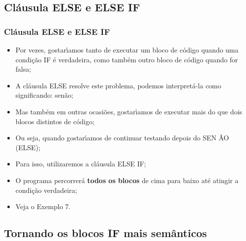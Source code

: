 \documentclass[xcolor=table]{beamer}
\newenvironment{stepitemize}{\begin{itemize}[<+->]}{\end{itemize} }
\begin{document}
\subsection{Cl\'{a}usula ELSE e ELSE IF}

\begin{frame}%

\frametitle{Cl\'{a}usula ELSE e ELSE IF}

\begin{stepitemize}
\item Por vezes, gostar\'{\i}amos tanto de executar um bloco de c\'{o}digo
quando uma condi\c{c}\~{a}o IF \'{e} verdadeira, como tamb\'{e}m outro bloco
de c\'{o}digo quando for falsa;

\item A cl\'{a}usula ELSE resolve este problema, podemos interpret\'{a}-la
como significando: sen\~{a}o;

\item Mas tamb\'{e}m em outras ocasi\~{o}es, gostar\'{\i}amos de executar
mais do que dois blocos distintos de c\'{o}digo;

\item Ou seja, quando gostar\'{\i}amos de continuar testando depois do SEN%
\~{A}O (ELSE);

\item Para isso, utilizaremos a cl\'{a}usula ELSE IF;

\item O programa percorrer\'{a} \textbf{todos os blocos} de cima para baixo
at\'{e} atingir a condi\c{c}\~{a}o verdadeira;

\item Veja o Exemplo 7.
\end{stepitemize}

\transboxout%
\end{frame}%

\subsection{Tornando os blocos IF mais sem\^{a}nticos}
\end{document}
